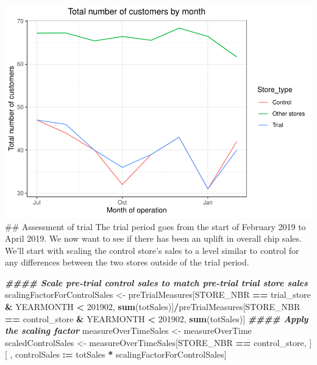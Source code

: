 \documentclass[
]{article}
\newenvironment{Shaded}{\begin{snugshade}}{\end{snugshade}}
\newcommand{\DecValTok}[1]{\textcolor[rgb]{0.00,0.00,0.81}{#1}}
\newcommand{\DocumentationTok}[1]{\textcolor[rgb]{0.56,0.35,0.01}{\textbf{\textit{#1}}}}
\newcommand{\FunctionTok}[1]{\textcolor[rgb]{0.13,0.29,0.53}{\textbf{#1}}}
\newcommand{\NormalTok}[1]{#1}
\newcommand{\OtherTok}[1]{\textcolor[rgb]{0.56,0.35,0.01}{#1}}
\newcommand{\SpecialCharTok}[1]{\textcolor[rgb]{0.81,0.36,0.00}{\textbf{#1}}}
\begin{document}
\includegraphics{InsideSherpa_Task2_files/figure-latex/unnamed-chunk-8-1.pdf}
\#\# Assessment of trial The trial period goes from the start of
February 2019 to April 2019. We now want to see if there has been an
uplift in overall chip sales. We'll start with scaling the control
store's sales to a level similar to control for any differences between
the two stores outside of the trial period.

\begin{Shaded}
\begin{Highlighting}[]
\DocumentationTok{\#\#\#\# Scale pre{-}trial control sales to match pre{-}trial trial store sales}
\NormalTok{scalingFactorForControlSales }\OtherTok{\textless{}{-}}\NormalTok{ preTrialMeasures[STORE\_NBR }\SpecialCharTok{==}\NormalTok{ trial\_store }\SpecialCharTok{\&}
\NormalTok{YEARMONTH }\SpecialCharTok{\textless{}} \DecValTok{201902}\NormalTok{, }\FunctionTok{sum}\NormalTok{(totSales)]}\SpecialCharTok{/}\NormalTok{preTrialMeasures[STORE\_NBR }\SpecialCharTok{==}\NormalTok{ control\_store }\SpecialCharTok{\&}
\NormalTok{YEARMONTH }\SpecialCharTok{\textless{}} \DecValTok{201902}\NormalTok{, }\FunctionTok{sum}\NormalTok{(totSales)]}
\DocumentationTok{\#\#\#\# Apply the scaling factor}
\NormalTok{measureOverTimeSales }\OtherTok{\textless{}{-}}\NormalTok{ measureOverTime}
\NormalTok{scaledControlSales }\OtherTok{\textless{}{-}}\NormalTok{ measureOverTimeSales[STORE\_NBR }\SpecialCharTok{==}\NormalTok{ control\_store, ][ ,}
\NormalTok{controlSales }\SpecialCharTok{:=}\NormalTok{ totSales }\SpecialCharTok{*}\NormalTok{ scalingFactorForControlSales]}
\end{Highlighting}
\end{Shaded}
\end{document}
